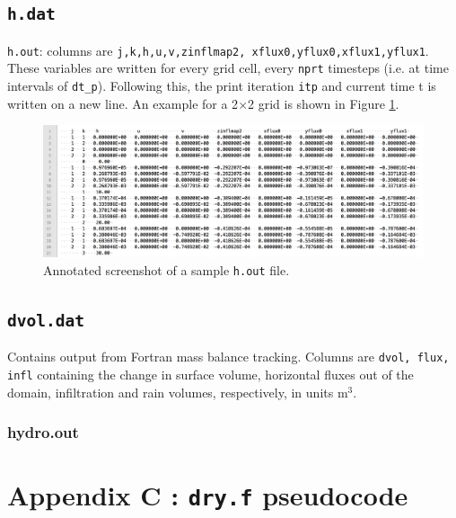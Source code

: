 \documentclass{article}
\newcommand{\code}[1]{\texttt{#1}}
\begin{document}
\subsection{\code{h.dat}}

\code{h.out}: columns are \code{j,k,h,u,v,zinflmap2, xflux0,yflux0,xflux1,yflux1}. 
These variables are written for every grid cell, every \code{nprt} timesteps (i.e. at time intervals of \code{dt\_p}). Following this, the print iteration \code{itp} and current time {t} is written on a new line. An example for a 2$\times$2 grid is shown in Figure \ref{h.out_example}.  

 \begin{figure}[h]
 \centering
\includegraphics[width=35pc]{grid/h_out.png}
 \caption{Annotated screenshot of a sample \code{h.out} file.}
 \label{h.out_example}
 \end{figure}
  
  


\subsection{\code{dvol.dat}}

Contains output from Fortran mass balance tracking.
Columns are \code{dvol, flux, infl} containing the  change in surface volume, horizontal fluxes out of the domain, infiltration and rain volumes, respectively, in units m$^3$.



\subsubsection*{hydro.out}







\section*{Appendix C : \code{dry.f} pseudocode}
\end{document}
